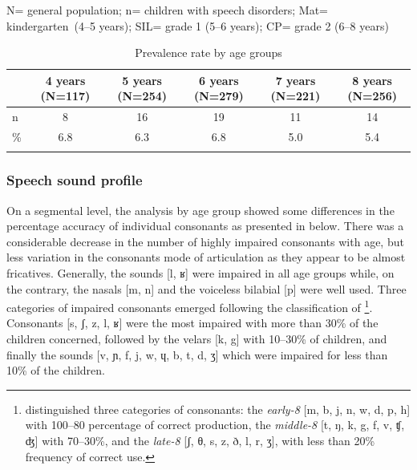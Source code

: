 \documentclass[output=paper,newtxmath,modfonts,nonflat,draftmode]{langsci/langscibook}
\begin{document}
N= general population; n= children with speech disorders; Mat= kindergarten~(4--5 years); SIL= grade 1 (5--6 years); CP= grade 2 (6--8 years)

\begin{table}
\caption{Prevalence rate by age groups}
\begin{tabularx}{\textwidth}{XSSSSS}
\lsptoprule
& { 4 years}  (N=117) &  5 years (N=254) &  6 years (N=279) &  7 years (N=221) &  8 years (N=256)\\
\midrule
n & 8 & 16 & 19 & 11 & 14\\
{\%} & 6.8 & 6.3 & 6.8 & 5.0 & 5.4\\
\lspbottomrule
\end{tabularx}
\label{tab:takam:4}
\end{table}


\subsubsection{Speech sound profile }%

On a segmental level, {the analysis by age group showed some differences in the percentage accuracy of individual consonants} as presented in  below. There was a considerable decrease in the number of highly impaired consonants with age, but less variation in the consonants mode of articulation as they appear to be almost fricatives. {Generally, t}he sounds [l, ʁ] were impaired in all age groups while, on the contrary, the nasals [m, n] and the voiceless bilabial [p] were well used. Three categories of impaired consonants emerged following the classification of \citet{Shriberg1994}\footnote{\citet{Shriberg1994} distinguished three categories of consonants: the \textit{early-8} [m, b, j, n, w, d, p, h] with 100--80 percentage of correct production, the \textit{middle-8} [t, ŋ, k, g, f, v, ʧ, ʤ] with 70--30\%, and the \textit{late-8} [ʃ, θ, s, z, ð, l, r, ʒ], with less than 20\% frequency of correct use.}. Consonants [s, ʃ, z, l, ʁ] were the most impaired with more than 30\% of the children concerned, followed by the velars [k, g] with 10--30\% of children, and finally the sounds [v, ɲ, f, j, w, ɥ, b, t, d, ʒ] which were impaired for less than 10\% of the children. 
\end{document}
